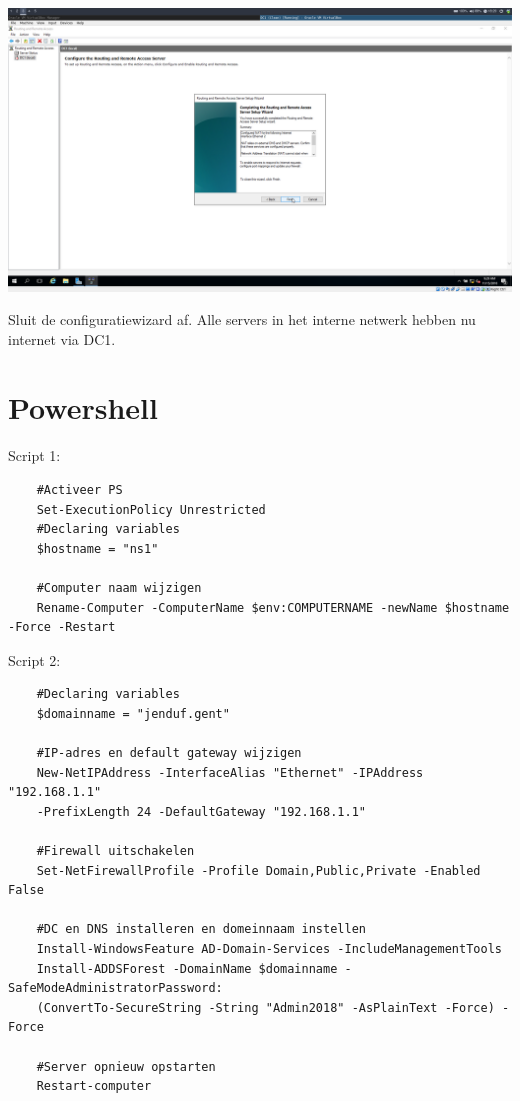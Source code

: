 \documentclass[a4paper]{article}
\begin{document}
\begin{center}
	\includegraphics[width=15cm]{Pictures/DC1/Routing/1542302960.png}
	
	Sluit de configuratiewizard af. Alle servers in het interne netwerk hebben nu internet via DC1.
\end{center}


\section{Powershell}
Script 1:
\begin{verbatim}
	#Activeer PS
	Set-ExecutionPolicy Unrestricted
	#Declaring variables
	$hostname = "ns1"
	
	#Computer naam wijzigen
	Rename-Computer -ComputerName $env:COMPUTERNAME -newName $hostname -Force -Restart
\end{verbatim}


Script 2:
\begin{verbatim}
	#Declaring variables
	$domainname = "jenduf.gent"
	
	#IP-adres en default gateway wijzigen
	New-NetIPAddress -InterfaceAlias "Ethernet" -IPAddress "192.168.1.1" 
	-PrefixLength 24 -DefaultGateway "192.168.1.1"
	
	#Firewall uitschakelen
	Set-NetFirewallProfile -Profile Domain,Public,Private -Enabled False
	
	#DC en DNS installeren en domeinnaam instellen
	Install-WindowsFeature AD-Domain-Services -IncludeManagementTools
	Install-ADDSForest -DomainName $domainname -SafeModeAdministratorPassword:
	(ConvertTo-SecureString -String "Admin2018" -AsPlainText -Force) -Force
	
	#Server opnieuw opstarten
	Restart-computer
\end{verbatim}
\end{document}
